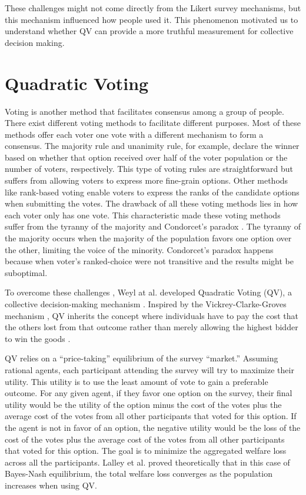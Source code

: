 These challenges might not come directly from the Likert survey mechanisms, but this mechanism influenced how people used it. This phenomenon motivated us to understand whether QV can provide a more truthful measurement for collective decision making.\par

\section{Quadratic Voting}
Voting is another method that facilitates consensus among a group of people. There exist different voting methods to facilitate different purposes. Most of these methods offer each voter one vote with a different mechanism to form a consensus. The majority rule and unanimity rule, for example, declare the winner based on whether that option received over half of the voter population or the number of voters, respectively. This type of voting rules are straightforward but suffers from allowing voters to express more fine-grain options\cite{sep-voting-methods}. Other methods like rank-based voting enable voters to express the ranks of the candidate options when submitting the votes. The drawback of all these voting methods lies in how each voter only has one vote. This characteristic made these voting methods suffer from the tyranny of the majority and Condorcet's paradox \cite{sep-voting-methods}. The tyranny of the majority occurs when the majority of the population favors one option over the other, limiting the voice of the minority. Condorcet's paradox happens because when voter's ranked-choice were not transitive and the results might be suboptimal.

To overcome these challenges \cite{posner2018radical}, Weyl at al. developed Quadratic Voting (QV), a collective decision-making mechanism \cite{lalley2018quadratic}. Inspired by the Vickrey-Clarke-Groves mechanism \cite{roughgarden2010algorithmic}, QV inherits the concept where individuals have to pay the cost that the others lost from that outcome rather than merely allowing the highest bidder to win the goods \cite{posner2018radical}. \par

QV relies on a ``price-taking'' equilibrium of the survey ``market.'' Assuming rational agents, each participant attending the survey will try to maximize their utility. This utility is to use the least amount of vote to gain a preferable outcome. For any given agent, if they favor one option on the survey, their final utility would be the utility of the option minus the cost of the votes plus the average cost of the votes from all other participants that voted for this option. If the agent is not in favor of an option, the negative utility would be the loss of the cost of the votes plus the average cost of the votes from all other participants that voted for this option. The goal is to minimize the aggregated welfare loss across all the participants. Lalley et al. \cite{lalley2018quadratic} proved theoretically that in this case of Bayes-Nash equilibrium, the total welfare loss converges as the population increases when using QV.\par

